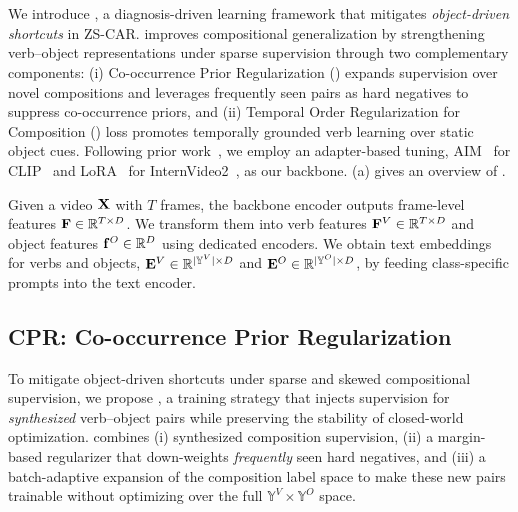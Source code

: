 \section{\ours{}}
\label{sec:method}


We introduce \ours{}, a diagnosis-driven learning framework that mitigates \emph{object-driven shortcuts} in ZS-CAR.  
\ours{} improves compositional generalization by strengthening verb–object representations under sparse supervision through two complementary components:  
(i) Co-occurrence Prior Regularization (\cpr{}) expands supervision over novel compositions and leverages frequently seen pairs as hard negatives to suppress co-occurrence priors, and  
(ii) Temporal Order Regularization for Composition (\torc{}) loss promotes temporally grounded verb learning over static object cues.
Following prior work~\cite{li2024c2c, jung2025crr}, we employ an adapter-based tuning, 
AIM~\cite{yang2023aim} for CLIP~\cite{radford2021clip} and LoRA~\cite{hu2022lora} for InternVideo2~\cite{wang2024iv2}, as our backbone.  
 (a) gives an overview of \ours{}.



Given a video $\mathbf{X}$ with $T$ frames, the backbone encoder outputs frame-level features $\mathbf{F} \in \mathbb{R}^{T \times D}$.  
We transform them into verb features $\mathbf{F}^V \in \mathbb{R}^{T \times D}$ and object features $\mathbf{f}^O \in \mathbb{R}^D$ using dedicated encoders.  
We obtain text embeddings for verbs and objects, $\mathbf{E}^V \in \mathbb{R}^{|\mathbb{Y}^V| \times D}$ and $\mathbf{E}^O \in \mathbb{R}^{|\mathbb{Y}^O| \times D}$, by feeding class-specific prompts 
into the text encoder.
\vspace{-1.0em}



\subsection{CPR: Co-occurrence Prior Regularization}
\label{sec:cpr}

To mitigate object-driven shortcuts under sparse and skewed compositional supervision, we propose \cpr{}, a training strategy that injects supervision for \emph{synthesized} verb--object pairs while preserving the stability of closed-world optimization.
\cpr{} combines (i) synthesized composition supervision, (ii) a margin-based regularizer that down-weights \emph{frequently} seen hard negatives, and (iii) a batch-adaptive expansion of the composition label space to make these new pairs trainable without optimizing over the full $\mathbb{Y}^V \times \mathbb{Y}^O$ space.

